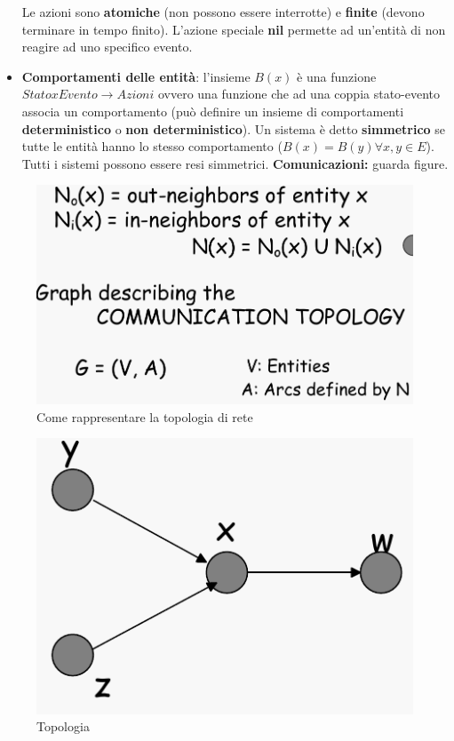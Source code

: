 \documentclass[12pt]{article}
\begin{document}
\begin{itemize}
			Le azioni sono \textbf{atomiche} (non possono essere interrotte) e \textbf{finite} (devono terminare in tempo finito). L'azione speciale \textbf{nil} permette ad un'entità di non reagire ad uno specifico evento.
			\item \textbf{Comportamenti delle entità}: l'insieme $B(x)$ è una funzione $Statox Evento \rightarrow Azioni$ ovvero una funzione che ad una coppia stato-evento associa un comportamento (può definire un insieme di comportamenti \textbf{deterministico} o \textbf{non deterministico}). Un sistema è detto \textbf{simmetrico} se tutte le entità hanno lo stesso comportamento ($B(x) = B(y) \forall x,y \in E$). Tutti i sistemi possono essere resi simmetrici.
			\textbf{Comunicazioni:} guarda figure.
		\end{itemize}
		\begin{figure}[h!]
			\centering
			\includegraphics[scale=0.30]{img/comun.png}
			\caption{Come rappresentare la topologia di rete}
		\end{figure}
		\begin{figure}[h!]
			\centering
			\includegraphics[scale=0.30]{img/graph.png}
			\caption{Topologia}
		\end{figure}
	
\end{document}
